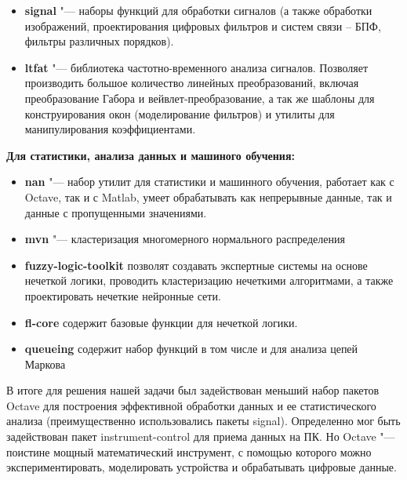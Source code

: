 \documentclass[10pt, a5paper]{article}
\begin{document}
\begin{itemize}
  \item \textbf{signal} "--- наборы функций для обработки сигналов (а также обработки изображений, проектирования цифровых фильтров и систем связи -- БПФ, фильтры различных порядков).
  \item \textbf{ltfat} "--- библиотека частотно-временного анализа сигналов. Позволяет производить большое количество линейных преобразований, включая преобразование Габора и вейвлет-преобразование, а так же шаблоны для конструирования окон (моделирование фильтров) и утилиты для манипулирования коэффициентами.
\end{itemize}

\textbf{Для статистики, анализа данных и машиного обучения:}

\begin{itemize}
  \item \textbf{nan} "--- набор утилит для статистики и машинного обучения, работает как с Octave, так и с Matlab, умеет обрабатывать как непрерывные данные, так и данные с пропущенными значениями.
  \item \textbf{mvn} "--- кластеризация многомерного нормального распределения
  \item \textbf{fuzzy-logic-toolkit} позволят создавать экспертные системы на основе нечеткой логики, проводить кластеризацию нечеткими алгоритмами, а также проектировать нечеткие нейронные сети.
  \item \textbf{fl-core} содержит базовые функции для нечеткой логики.
  \item \textbf{queueing} содержит набор функций в том числе и для анализа цепей Маркова
\end{itemize}

В итоге для решения нашей задачи был задействован меньший набор пакетов Octave для построения эффективной обработки данных и ее статистического анализа (преимущественно использовались пакеты signal). Определенно мог быть задействован пакет instrument-control для приема данных на ПК.
Но Octave "--- поистине мощный математический инструмент, с помощью которого можно экспериментировать, моделировать устройства и обрабатывать цифровые данные.
\end{document}
